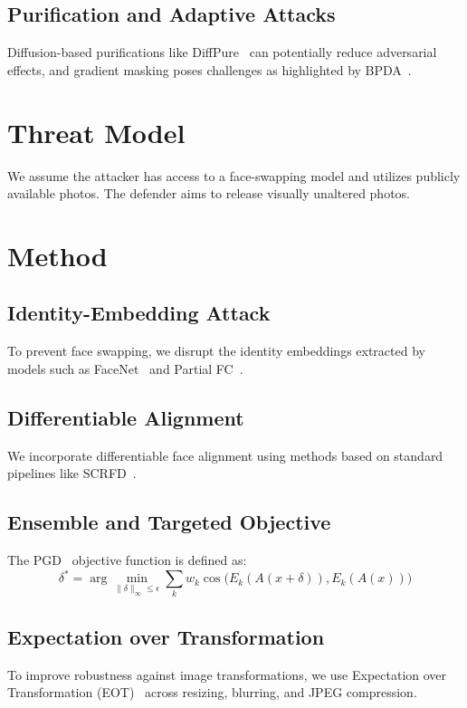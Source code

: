 \documentclass[conference]{IEEEtran}
\begin{document}
\subsection{Purification and Adaptive Attacks}
Diffusion-based purifications like DiffPure~\cite{nie2022diffpure} can potentially reduce adversarial effects, and gradient masking poses challenges as highlighted by BPDA~\cite{athalye2018obfuscated}.

\section{Threat Model}
We assume the attacker has access to a face-swapping model and utilizes publicly available photos. The defender aims to release visually unaltered photos.

\section{Method}
\subsection{Identity-Embedding Attack}
To prevent face swapping, we disrupt the identity embeddings extracted by models such as FaceNet~\cite{schroff2015facenet} and Partial FC~\cite{an2021partial}.

\subsection{Differentiable Alignment}
We incorporate differentiable face alignment using methods based on standard pipelines like SCRFD~\cite{guo2022sample}.

\subsection{Ensemble and Targeted Objective}
The PGD~\cite{madry2018towards} objective function is defined as:
\begin{equation}
\delta^* = \arg\min_{\|\delta\|_\infty \le \epsilon} \sum_k w_k \cos\big(E_k(A(x+\delta)), E_k(A(x))\big)
\end{equation}

\subsection{Expectation over Transformation}
To improve robustness against image transformations, we use Expectation over Transformation (EOT)~\cite{athalye2018synthesizing} across resizing, blurring, and JPEG compression.
\end{document}
